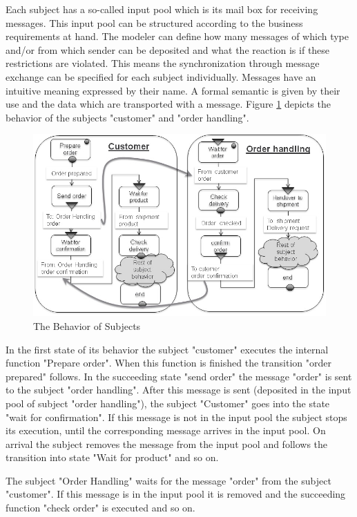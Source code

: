 Each subject has a so-called input pool which is its mail box for receiving messages. This input pool can be structured according to the business requirements at hand. The modeler can define how many messages of which type and/or from which sender can be deposited and what the reaction is if these restrictions are violated. This means the synchronization through message exchange can be specified for each subject individually.
Messages have an intuitive meaning expressed by their name. A formal semantic is given by their use and the data which are transported with a message. Figure \ref{fig:ordercustomerorderhandling} depicts the behavior of the subjects "customer" and "order handling".\\
\newpage
\begin{figure}[ph]
	\centering
	\includegraphics[width=0.7\linewidth]{20181026-Ontologie-Bilder/Grafiken-Ontologie/SUbjectExecution/OrderCustomerOrderHandling}
	\caption[The Behavior of Subjects]{The Behavior of Subjects}
	\label{fig:ordercustomerorderhandling}
\end{figure}

In the first state of its behavior the subject "customer" executes the internal function "Prepare order". When this function is finished the transition "order prepared" follows. In the succeeding state "send order" the message "order" is sent to the subject "order handling". After this message is sent (deposited in the input pool of subject "order handling"), the subject "Customer" goes into the state "wait for confirmation". If this message is not in the input pool the subject stops its execution, until the corresponding message arrives in the input pool. On arrival the subject removes the message from the input pool and follows the transition into state "Wait for product" and so on.

The subject "Order Handling" waits for the message "order" from the subject "customer". If this message is in the input pool it is removed and the succeeding function "check order" is executed and so on.

